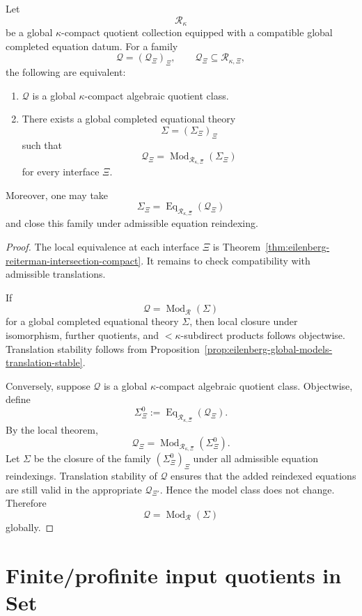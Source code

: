 \begin{theorem}
\label{thm:eilenberg-global-reiterman-intersection-compact}
Let
\[
\mathcal R_\kappa
\]
be a global \(\kappa\)-compact quotient collection equipped with a compatible
global completed equation datum. For a family
\[
\mathcal Q=(\mathcal Q_\Xi)_\Xi,
\qquad
\mathcal Q_\Xi\subseteq\mathcal R_{\kappa,\Xi},
\]
the following are equivalent:
\begin{enumerate}
\item \(\mathcal Q\) is a global \(\kappa\)-compact algebraic quotient class.
\item There exists a global completed equational theory
\[
\Sigma=(\Sigma_\Xi)_\Xi
\]
such that
\[
\mathcal Q_\Xi
=
\operatorname{Mod}_{\mathcal R_{\kappa,\Xi}}(\Sigma_\Xi)
\]
for every interface \(\Xi\).
\end{enumerate}
Moreover, one may take
\[
\Sigma_\Xi
=
\operatorname{Eq}_{\mathcal R_{\kappa,\Xi}}(\mathcal Q_\Xi)
\]
and close this family under admissible equation reindexing.
\end{theorem}

\begin{proof}
The local equivalence at each interface \(\Xi\) is
Theorem~\ref{thm:eilenberg-reiterman-intersection-compact}. It remains to
check compatibility with admissible translations.

If
\[
\mathcal Q=\operatorname{Mod}_{\mathcal R}(\Sigma)
\]
for a global completed equational theory \(\Sigma\), then local closure under
isomorphism, further quotients, and \(<\kappa\)-subdirect products follows
objectwise. Translation stability follows from
Proposition~\ref{prop:eilenberg-global-models-translation-stable}.

Conversely, suppose \(\mathcal Q\) is a global \(\kappa\)-compact algebraic
quotient class. Objectwise, define
\[
\Sigma_\Xi^0
:=
\operatorname{Eq}_{\mathcal R_{\kappa,\Xi}}(\mathcal Q_\Xi).
\]
By the local theorem,
\[
\mathcal Q_\Xi
=
\operatorname{Mod}_{\mathcal R_{\kappa,\Xi}}(\Sigma_\Xi^0).
\]
Let \(\Sigma\) be the closure of the family \((\Sigma_\Xi^0)_\Xi\) under all
admissible equation reindexings. Translation stability of \(\mathcal Q\)
ensures that the added reindexed equations are still valid in the appropriate
\(\mathcal Q_{\Xi'}\). Hence the model class does not change. Therefore
\[
\mathcal Q
=
\operatorname{Mod}_{\mathcal R}(\Sigma)
\]
globally.
\end{proof}

\section{Finite/profinite input quotients in Set}
\label{sec:eilenberg-finite-profinite-input-quotients}

